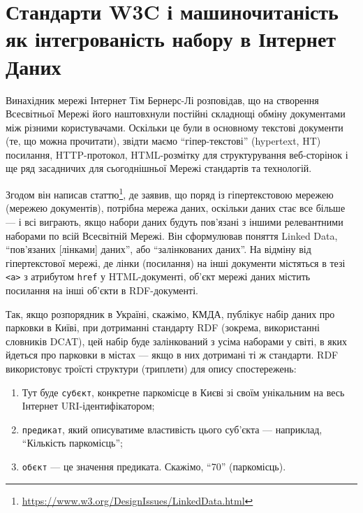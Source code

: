 \documentclass[
]{agujournal2019}
\providecommand{\tightlist}{%
  \setlength{\itemsep}{0pt}\setlength{\parskip}{0pt}}\usepackage{longtable,booktabs,array}
\begin{document}
\section{\texorpdfstring{\textbf{Стандарти W3C і машиночитаність як
інтегрованість набору в Інтернет
Даних}}{Стандарти W3C і машиночитаність як інтегрованість набору в Інтернет Даних}}\label{ux441ux442ux430ux43dux434ux430ux440ux442ux438-w3c-ux456-ux43cux430ux448ux438ux43dux43eux447ux438ux442ux430ux43dux456ux441ux442ux44c-ux44fux43a-ux456ux43dux442ux435ux433ux440ux43eux432ux430ux43dux456ux441ux442ux44c-ux43dux430ux431ux43eux440ux443-ux432-ux456ux43dux442ux435ux440ux43dux435ux442-ux434ux430ux43dux438ux445}

Винахідник мережі Інтернет Тім Бернерс-Лі розповідав, що на створення
Всесвітньої Мережі його наштовхнули постійні складнощі обміну
документами між різними користувачами. Оскільки це були в основному
текстові документи (те, що можна прочитати), звідти маємо
``гіпер-текстові'' (hypertext, HT) посилання, HTTP-протокол,
HTML-розмітку для структурування веб-сторінок і ще ряд засадничих для
сьогоднішньої Мережі стандартів та технологій.

Згодом він написав статтю\footnote{\url{https://www.w3.org/DesignIssues/LinkedData.html}},
де заявив, що поряд із гіпертекстовою мережею (мережею документів),
потрібна мережа даних, оскільки даних стає все більше --- і всі
виграють, якщо набори даних будуть пов'язані з іншими релевантними
наборами по всій Всесвітній Мережі. Він сформулював поняття Linked Data,
``пов'язаних {[}лінками{]} даних'', або ``залінкованих даних''. На
відміну від гіпертекстової мережі, де лінки (посилання) на інші
документи містяться в тезі \texttt{\textless{}a\textgreater{}} з
атрибутом \texttt{href} у HTML-документі, об'єкт мережі даних містить
посилання на інші об'єкти в RDF-документі.

Так, якщо розпорядник в Україні, скажімо, КМДА, публікує набір даних про
парковки в Київі, при дотриманні стандарту RDF (зокрема, використанні
словників DCAT), цей набір буде залінкований з усіма наборами у світі, в
яких йдеться про парковки в містах --- якщо в них дотримані ті ж
стандарти. RDF використовує троїсті структури (триплети) для опису
спостережень:

\begin{enumerate}
\def\labelenumi{\arabic{enumi}.}
\tightlist
\item
  Тут буде \texttt{суб\textquotesingle{}єкт}, конкретне паркомісце в
  Києві зі своїм унікальним на весь Інтернет URI-ідентифікатором;
\item
  \texttt{предикат}, який описуватиме властивість цього суб'єкта ---
  наприклад, ``Кількість паркомісць'';
\item
  \texttt{об\textquotesingle{}єкт} --- це значення предиката. Скажімо,
  ``70'' (паркомісць).
\end{enumerate}
\end{document}
